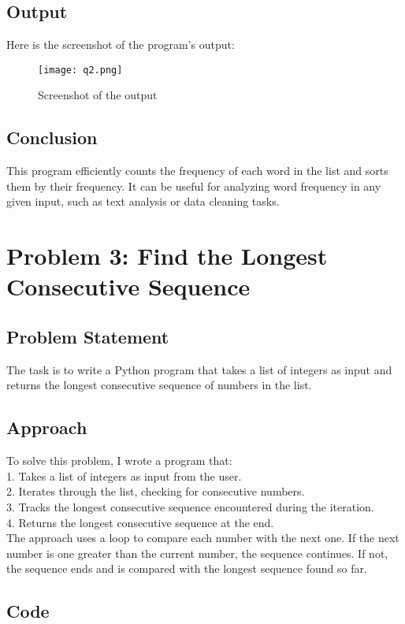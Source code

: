\documentclass{article}
\begin{document}
\subsection{Output}
Here is the screenshot of the program's output:

\begin{figure}[h!]
    \centering
    \texttt{[image: q2.png]}  %
    \caption{Screenshot of the output}
\end{figure}

\subsection{Conclusion}
This program efficiently counts the frequency of each word in the list and sorts them by their frequency. It can be useful for analyzing word frequency in any given input, such as text analysis or data cleaning tasks.
\section{Problem 3: Find the Longest Consecutive Sequence}

\subsection{Problem Statement}
The task is to write a Python program that takes a list of integers as input and returns the longest consecutive sequence of numbers in the list.

\subsection{Approach}
To solve this problem, I wrote a program that:\\
1. Takes a list of integers as input from the user.\\
2. Iterates through the list, checking for consecutive numbers.\\
3. Tracks the longest consecutive sequence encountered during the iteration.\\
4. Returns the longest consecutive sequence at the end.\\
The approach uses a loop to compare each number with the next one. If the next number is one greater than the current number, the sequence continues. If not, the sequence ends and is compared with the longest sequence found so far.

\subsection{Code}
\end{document}
